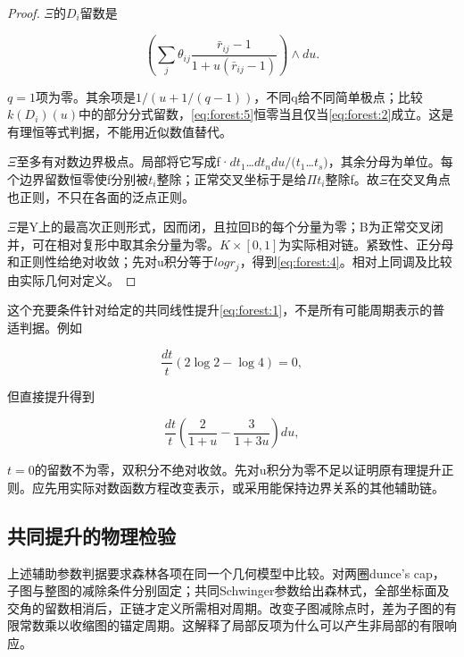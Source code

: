 \documentclass[11pt,a4paper,oneside]{ctexart}
\theoremstyle{cnplain}
\theoremstyle{definition}
\theoremstyle{remark}
\numberwithin{equation}{section}
\begin{document}
\begin{proof}

\(\Xi \)的\(D_i\)留数是

\begin{equation}
\left(\sum_j\theta_{ij}
       \frac{\bar r_{ij}-1}{1+u(\bar r_{ij}-1)}\right)\wedge du.   \label{eq:forest:5}
\end{equation}

\(q=1\)项为零。其余项是\(1/(u+1/(q- 1))\)，不同q给不同简单极点；比较\(k(D_i)(u)\)中的部分分式留数，\eqref{eq:forest:5}恒零当且仅当\eqref{eq:forest:2}成立。这是有理恒等式判据，不能用近似数值替代。

\(\Xi \)至多有对数边界极点。局部将它写成f·\(dt_1\)\ldots{}\(dt_n du/(t_1\)\ldots{}\(t_s)\)，其余分母为单位。每个边界留数恒零使f分别被\(t_i\)整除；正常交叉坐标于是给\(\Pi t_i\)整除f。故\(\Xi \)在交叉角点也正则，不只在各面的泛点正则。

\(\Xi \)是Y上的最高次正则形式，因而闭，且拉回B的每个分量为零；B为正常交叉闭并，可在相对复形中取其余分量为零。\(K\times [0,1]\)为实际相对链。紧致性、正分母和正则性给绝对收敛；先对u积分等于\(log r_j\)，得到\eqref{eq:forest:4}。相对上同调及比较由实际几何对定义。

\end{proof}

这个充要条件针对给定的共同线性提升\eqref{eq:forest:1}，不是所有可能周期表示的普适判据。例如

\begin{equation}
\frac{dt}{t}(2\log2-\log4)=0,
\end{equation}

但直接提升得到

\begin{equation}
\frac{dt}{t}
 \left(\frac2{1+u}-\frac3{1+3u}\right)du,                        \label{eq:forest:6}
\end{equation}

\(t=0\)的留数不为零，双积分不绝对收敛。先对u积分为零不足以证明原有理提升正则。应先用实际对数函数方程改变表示，或采用能保持边界关系的其他辅助链。


\endgroup
\subsection{共同提升的物理检验}
上述辅助参数判据要求森林各项在同一个几何模型中比较。对两圈dunce's cap，子图与整图的减除条件分别固定；共同Schwinger参数给出森林式，全部坐标面及交角的留数相消后，正链才定义所需相对周期。改变子图减除点时，差为子图的有限常数乘以收缩图的锚定周期。这解释了局部反项为什么可以产生非局部的有限响应。
\end{document}
